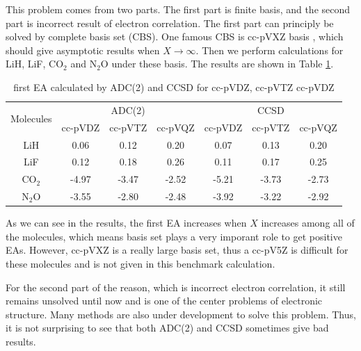 This problem comes from two parts.
The first part is finite basis, and the second part is incorrect result of electron correlation.
The first part can principly be solved by complete basis set (CBS).
One famous CBS is cc-pVXZ basis \cite{CBS}, which should give asymptotic results when $X \rightarrow \infty$.
Then we perform calculations for LiH, LiF, CO$_2$ and N$_2$O under these basis.
The results are shown in Table \ref{ccpVXZ}.
\begin{table}
	\centering
	\caption{first EA calculated by ADC(2) and CCSD for cc-pVDZ, cc-pVTZ cc-pVDZ}
	\label{ccpVXZ}
	\begin{tabular}{|c|c|c|c|c|c|c|}
		\hline
		\multirow{2}{*}{Molecules} & \multicolumn{3}{c|}{ADC(2)} & \multicolumn{3}{c|}{CCSD}   \\ \cline{2-7} 
								   & cc-pVDZ & cc-pVTZ & cc-pVQZ & cc-pVDZ & cc-pVTZ & cc-pVQZ \\ \hline
		LiH                        & 0.06    & 0.12    & 0.20    & 0.07    & 0.13    & 0.20    \\ \hline
		LiF                        & 0.12    & 0.18    & 0.26    & 0.11    & 0.17    & 0.25    \\ \hline
		CO$_2$                     & -4.97   & -3.47   & -2.52   & -5.21   & -3.73   & -2.73   \\ \hline
		N$_2$O                     & -3.55   & -2.80   & -2.48   & -3.92   & -3.22   & -2.92   \\ \hline
	\end{tabular}
\end{table}
As we can see in the results, the first EA increases when $X$ increases among all of the molecules, which means basis set plays a very imporant role to get positive EAs.
However, cc-pVXZ is a really large basis set, thus a cc-pV5Z is difficult for these molecules and is not given in this benchmark calculation.

For the second part of the reason, which is incorrect electron correlation, it still remains unsolved until now and is one of the center problems of electronic structure.
Many methods are also under development to solve this problem.
Thus, it is not surprising to see that both ADC(2) and CCSD sometimes give bad results.
